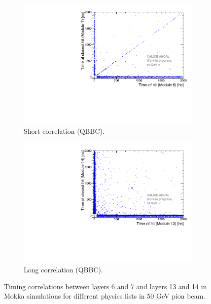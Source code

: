 \begin{figure}[htbp!]
\begin{subfigure}[t]{0.5\textwidth}
		\includegraphics[width=1\textwidth]{chap5/fig_AHCAL_timing/Pions/ComparisonToSim/Time_Correlation_50GeV_short_QBBC.pdf}
		\caption{Short correlation (QBBC).} \label{fig:Corr_short_QBBC}
	\end{subfigure}
	\hfill
	\begin{subfigure}[t]{0.5\textwidth}
		\centering
		\includegraphics[width=1\textwidth]{chap5/fig_AHCAL_timing/Pions/ComparisonToSim/Time_Correlation_50GeV_long_QBBC.pdf}
		\caption{Long correlation (QBBC).} \label{fig:Corr_long_QBBC}
	\end{subfigure}
	\caption{Timing correlations between layers 6 and 7 and layers 13 and 14 in Mokka simulations for different physics lists in 50 GeV pion beam.}
	\label{fig:Corr_Mokka_Simulation}
\end{figure}
